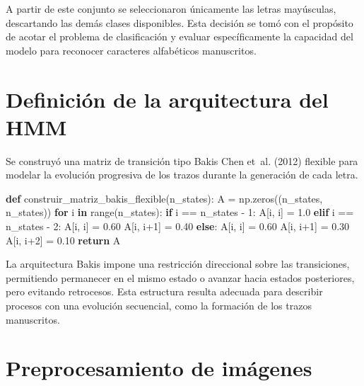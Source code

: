 \documentclass[
  spanish,
  us-letterpaper,
  DIV=11,
  numbers=noendperiod]{scrreprt}
\newenvironment{Shaded}{\begin{snugshade}}{\end{snugshade}}
\newcommand{\BuiltInTok}[1]{\textcolor[rgb]{0.00,0.23,0.31}{#1}}
\newcommand{\ControlFlowTok}[1]{\textcolor[rgb]{0.00,0.23,0.31}{\textbf{#1}}}
\newcommand{\DecValTok}[1]{\textcolor[rgb]{0.68,0.00,0.00}{#1}}
\newcommand{\FloatTok}[1]{\textcolor[rgb]{0.68,0.00,0.00}{#1}}
\newcommand{\KeywordTok}[1]{\textcolor[rgb]{0.00,0.23,0.31}{\textbf{#1}}}
\newcommand{\NormalTok}[1]{\textcolor[rgb]{0.00,0.23,0.31}{#1}}
\newcommand{\OperatorTok}[1]{\textcolor[rgb]{0.37,0.37,0.37}{#1}}
\begin{document}
A partir de este conjunto se seleccionaron únicamente las letras
mayúsculas, descartando las demás clases disponibles. Esta decisión se
tomó con el propósito de acotar el problema de clasificación y evaluar
específicamente la capacidad del modelo para reconocer caracteres
alfabéticos manuscritos.

\section{Definición de la arquitectura del
HMM}\label{definiciuxf3n-de-la-arquitectura-del-hmm}

Se construyó una matriz de transición tipo Bakis Chen et~al. (2012)
flexible para modelar la evolución progresiva de los trazos durante la
generación de cada letra.

\begin{Shaded}
\begin{Highlighting}[]
\KeywordTok{def}\NormalTok{ construir\_matriz\_bakis\_flexible(n\_states):}
\NormalTok{    A }\OperatorTok{=}\NormalTok{ np.zeros((n\_states, n\_states))}
    \ControlFlowTok{for}\NormalTok{ i }\KeywordTok{in} \BuiltInTok{range}\NormalTok{(n\_states):}
        \ControlFlowTok{if}\NormalTok{ i }\OperatorTok{==}\NormalTok{ n\_states }\OperatorTok{{-}} \DecValTok{1}\NormalTok{:}
\NormalTok{            A[i, i] }\OperatorTok{=} \FloatTok{1.0}
        \ControlFlowTok{elif}\NormalTok{ i }\OperatorTok{==}\NormalTok{ n\_states }\OperatorTok{{-}} \DecValTok{2}\NormalTok{:}
\NormalTok{            A[i, i] }\OperatorTok{=} \FloatTok{0.60}
\NormalTok{            A[i, i}\OperatorTok{+}\DecValTok{1}\NormalTok{] }\OperatorTok{=} \FloatTok{0.40}
        \ControlFlowTok{else}\NormalTok{:}
\NormalTok{            A[i, i] }\OperatorTok{=} \FloatTok{0.60}
\NormalTok{            A[i, i}\OperatorTok{+}\DecValTok{1}\NormalTok{] }\OperatorTok{=} \FloatTok{0.30}
\NormalTok{            A[i, i}\OperatorTok{+}\DecValTok{2}\NormalTok{] }\OperatorTok{=} \FloatTok{0.10}
    \ControlFlowTok{return}\NormalTok{ A}
\end{Highlighting}
\end{Shaded}

La arquitectura Bakis impone una restricción direccional sobre las
transiciones, permitiendo permanecer en el mismo estado o avanzar hacia
estados posteriores, pero evitando retrocesos. Esta estructura resulta
adecuada para describir procesos con una evolución secuencial, como la
formación de los trazos manuscritos.

\section{Preprocesamiento de
imágenes}\label{preprocesamiento-de-imuxe1genes}
\end{document}
